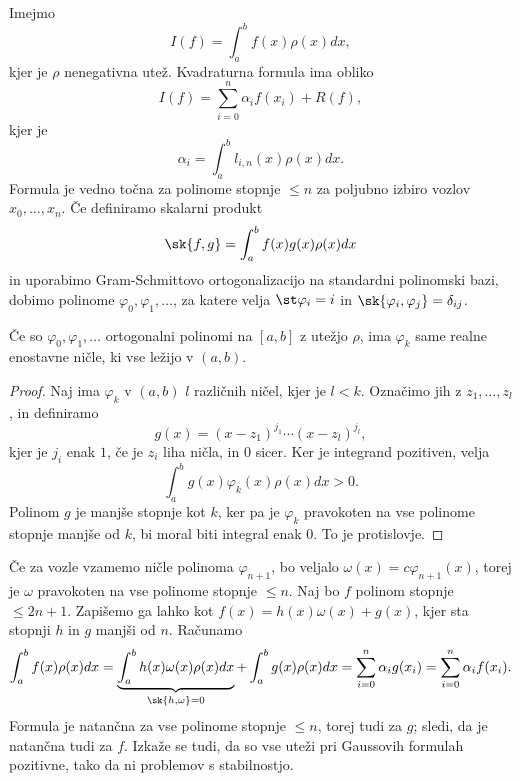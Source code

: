 

Imejmo
\[
  I(f) = \int_a^b f(x) \rho(x) dx,
\]
kjer je $\rho$ nenegativna utež.
Kvadraturna formula ima obliko
\[
  I(f) = \sum_{i=0}^n \alpha_i f(x_i) + R(f),
\]
kjer je
\[
  \alpha_i = \int_a^b l_{i,n}(x) \rho(x) dx.
\]
Formula je vedno točna za polinome stopnje $\le n$ za poljubno izbiro vozlov
$x_0, \ldots, x_n$.
Če definiramo skalarni produkt
\[
  \sk{f, g} = \int_a^b f(x) g(x) \rho(x) dx
\]
in uporabimo Gram-Schmittovo ortogonalizacijo na standardni polinomski bazi,
dobimo polinome $\varphi_0, \varphi_1, \ldots$, za katere velja $\st \varphi_i =
i$ in $\sk{\varphi_i, \varphi_j} = \delta_{ij}$.

\begin{izrek}
  Če so $\varphi_0, \varphi_1, \ldots$ ortogonalni polinomi na $[a,b]$ z utežjo
  $\rho$, ima $\varphi_k$ same realne enostavne ničle, ki vse ležijo v $(a,b)$.
\end{izrek}

\begin{proof}
  Naj ima $\varphi_k$ v $(a, b)$ $l$ različnih ničel, kjer je $l < k$.
  Označimo jih z $z_1, \ldots, z_l$, in definiramo
  \[
	g(x) = (x - z_1)^{j_1} \cdots (x - z_l)^{j_l},
  \]
  kjer je $j_i$ enak $1$, če je $z_i$ liha ničla, in $0$ sicer.
  Ker je integrand pozitiven, velja
  \[
	\int_a^b g(x) \varphi_k(x) \rho(x) dx > 0.
  \]
  Polinom $g$ je manjše stopnje kot $k$, ker pa je $\varphi_k$ pravokoten na vse
  polinome stopnje manjše od $k$, bi moral biti integral enak $0$.
  To je protislovje.
\end{proof}

Če za vozle vzamemo ničle polinoma $\varphi_{n+1}$, bo veljalo $\omega(x) = c
\varphi_{n+1}(x)$, torej je $\omega$ pravokoten na vse polinome stopnje $\le n$.
Naj bo $f$ polinom stopnje $\le 2n+1$.
Zapišemo ga lahko kot $f(x) = h(x) \omega(x) + g(x)$, kjer sta stopnji $h$ in
$g$ manjši od $n$.
Računamo
\[
  \int_a^b f(x) \rho(x) dx
  = \underbrace{\int_a^b h(x) \omega(x) \rho(x) dx}_{\sk{h, \omega} = 0} +
  \int_a^b g(x) \rho(x) dx
  = \sum_{i=0}^n \alpha_i g(x_i) = \sum_{i=0}^n \alpha_i f(x_i).
\]
Formula je natančna za vse polinome stopnje $\le n$, torej tudi za $g$; sledi,
da je natančna tudi za $f$.
Izkaže se tudi, da so vse uteži pri Gaussovih formulah pozitivne, tako da ni
problemov s stabilnostjo.



